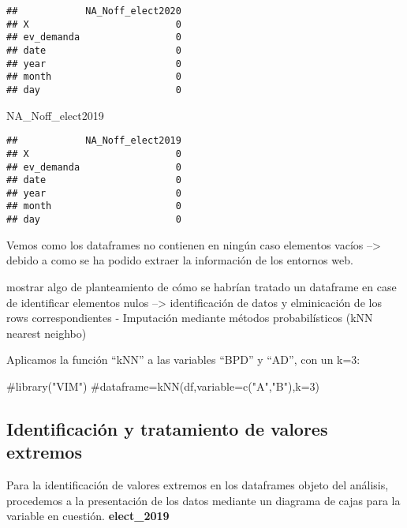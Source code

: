\documentclass[
]{article}
\newenvironment{Shaded}{\begin{snugshade}}{\end{snugshade}}
\newcommand{\CommentTok}[1]{\textcolor[rgb]{0.50,0.62,0.50}{#1}}
\newcommand{\NormalTok}[1]{\textcolor[rgb]{0.80,0.80,0.80}{#1}}
\begin{document}
\begin{verbatim}
##            NA_Noff_elect2020
## X                          0
## ev_demanda                 0
## date                       0
## year                       0
## month                      0
## day                        0
\end{verbatim}

\begin{Shaded}
\begin{Highlighting}[]
\NormalTok{NA_Noff_elect2019}
\end{Highlighting}
\end{Shaded}

\begin{verbatim}
##            NA_Noff_elect2019
## X                          0
## ev_demanda                 0
## date                       0
## year                       0
## month                      0
## day                        0
\end{verbatim}

Vemos como los dataframes no contienen en ningún caso elementos vacíos
--\textgreater{} debido a como se ha podido extraer la información de
los entornos web.

mostrar algo de planteamiento de cómo se habrían tratado un dataframe en
case de identificar elementos nulos --\textgreater{} identificación de
datos y elminicación de los rows correspondientes - Imputación mediante
métodos probabilísticos (kNN nearest neighbo)

Aplicamos la función ``kNN'' a las variables ``BPD'' y ``AD'', con un
k=3:

\begin{Shaded}
\begin{Highlighting}[]
\CommentTok{#library("VIM")}
\CommentTok{#dataframe=kNN(df,variable=c("A","B"),k=3)}
\end{Highlighting}
\end{Shaded}

\hypertarget{identificaciuxf3n-y-tratamiento-de-valores-extremos}{%
\subsection{Identificación y tratamiento de valores
extremos}\label{identificaciuxf3n-y-tratamiento-de-valores-extremos}}

Para la identificación de valores extremos en los dataframes objeto del
análisis, procedemos a la presentación de los datos mediante un diagrama
de cajas para la variable en cuestión. \textbf{elect\_2019}
\end{document}
